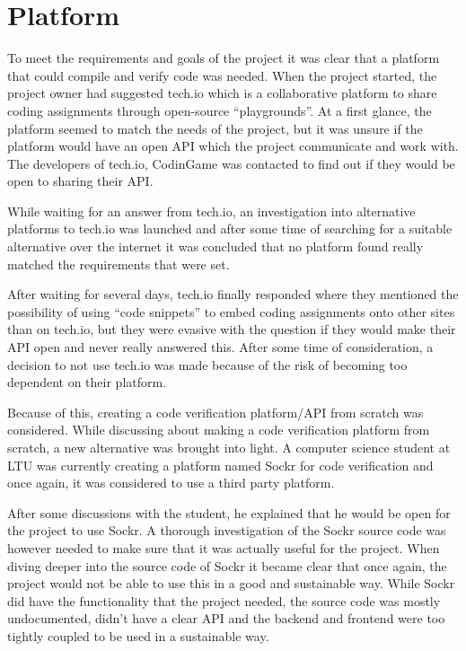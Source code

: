 \section{Platform}   
To meet the requirements and goals of the project it was clear that a platform that could compile and verify code was needed.
When the project started, the project owner had suggested tech.io which is a collaborative platform to share coding assignments through open-source ``playgrounds''. At a first glance, the platform seemed to match the needs of the project, but it was unsure if the platform would have an open API which the project communicate and work with. The developers of tech.io, CodinGame was contacted to find out if they would be open to sharing their API.


While waiting for an answer from tech.io, an investigation into alternative platforms to tech.io was launched and after some time of searching for a suitable alternative over the internet it was concluded that no platform found really matched the requirements that were set.

After waiting for several days, tech.io finally responded where they mentioned the possibility of using ``code snippets'' to embed coding assignments onto other sites than on tech.io, but they were evasive with the question if they would make their API open and never really answered this. After some time of consideration, a decision to not use tech.io was made because of the risk of becoming too dependent on their platform.

Because of this, creating a code verification platform/API from scratch was considered. While discussing about making a code verification platform from scratch, a new alternative was brought into light. A computer science student at LTU was currently creating a platform named Sockr for code verification and once again, it was considered to use a third party platform.

After some discussions with the student, he explained that he would be open for the project to use Sockr. A thorough investigation of the Sockr source code was however needed to make sure that it was actually useful for the project. When diving deeper into the source code of Sockr it became clear that once again, the project would not be able to use this in a good and sustainable way. While Sockr did have the functionality that the project needed, the source code was mostly undocumented, didn't have a clear API and the backend and frontend were too tightly coupled to be used in a sustainable way.


